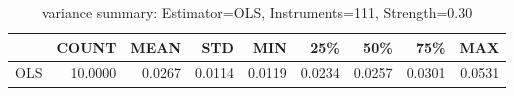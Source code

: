\begin{table}[ht]
\centering
\caption{variance summary: Estimator=OLS, Instruments=111, Strength=0.30}
\begin{tabular}{lrrrrrrrr}
\toprule
 & COUNT & MEAN & STD & MIN & 25\% & 50\% & 75\% & MAX \\
\midrule
OLS & 10.0000 & 0.0267 & 0.0114 & 0.0119 & 0.0234 & 0.0257 & 0.0301 & 0.0531 \\
\bottomrule
\end{tabular}
\end{table}
